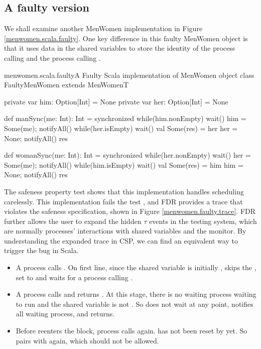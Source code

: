 \documentclass[a4paper, 12pt]{article}
\begin{document}
\subsection{A faulty version}
We shall examine another MenWomen implementation in Figure \ref{menwomen.scala.faulty}. One key difference in this faulty MenWomen object is that it uses  data in the shared variables to store the identity of the process calling  and the process calling . 

\begin{scalafloat}{menwomen.scala.faulty}{A Faulty Scala implementation of MenWomen object}
class FaultyMenWomen extends MenWomenT{
  private var him: Option[Int] = None
  private var her: Option[Int] = None

  def manSync(me: Int): Int = synchronized{
    while(him.nonEmpty) wait()
    him = Some(me); notifyAll()
    while(her.isEmpty) wait()   
    val Some(res) = her
    her = None; notifyAll()
    res
  }

  def womanSync(me: Int): Int = synchronized{
    while(her.nonEmpty) wait()
    her = Some(me); notifyAll()
    while(him.isEmpty) wait()  
    val Some(res) = him
    him = None; notifyAll()
    res
  }
}
\end{scalafloat}

The safeness property test shows that this implementation handles scheduling carelessly. This implementation fails the test \CSPM{Spec2Thread [T= System2}, and FDR provides a trace that violates the safeness specification, shown in Figure \ref{menwomen.faulty.trace}. FDR further allows the user to expand the hidden $\tau$ events in the testing system, which are normally processes' interactions with shared variables and the monitor. By understanding the expanded trace in CSP, we can find an equivalent way to trigger the bug in Scala.


\begin{itemize}
  \item A process  calls . On first line, since the shared variable  is initially ,  skips the , set  to  and waits for a process calling .
  \item A process  calls  and returns . At this stage, there is no waiting process waiting to run  and the shared variable is not . So  does not wait at any point, notifies all waiting process, and returns.
  \item Before  reenters the  block, process  calls  again.  has not been reset by  yet. So  pairs with  again, which should not be allowed. 
\end{itemize}
\end{document}
